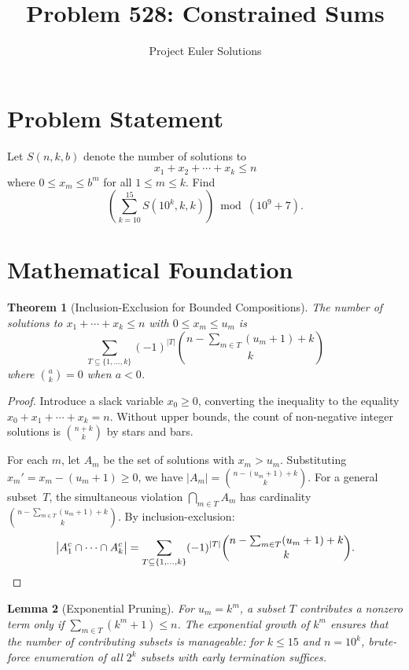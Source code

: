 \documentclass[11pt]{article}
\title{Problem 528: Constrained Sums}
\author{Project Euler Solutions}
\date{}
\newtheorem{theorem}{Theorem}
\newtheorem{lemma}[theorem]{Lemma}
\begin{document}
\maketitle

\section{Problem Statement}
Let $S(n,k,b)$ denote the number of solutions to
\[
x_1 + x_2 + \cdots + x_k \le n
\]
where $0 \le x_m \le b^m$ for all $1 \le m \le k$. Find
\[
\left(\sum_{k=10}^{15} S(10^k, k, k)\right) \bmod (10^9+7).
\]

\section{Mathematical Foundation}

\begin{theorem}[Inclusion-Exclusion for Bounded Compositions]
The number of solutions to $x_1 + \cdots + x_k \le n$ with $0 \le x_m \le u_m$ is
\[
\sum_{T \subseteq \{1,\ldots,k\}} (-1)^{|T|} \binom{n - \sum_{m \in T}(u_m+1) + k}{k}
\]
where $\binom{a}{k} = 0$ when $a < 0$.
\end{theorem}

\begin{proof}
Introduce a slack variable $x_0 \ge 0$, converting the inequality to the equality $x_0 + x_1 + \cdots + x_k = n$. Without upper bounds, the count of non-negative integer solutions is $\binom{n+k}{k}$ by stars and bars.

For each $m$, let $A_m$ be the set of solutions with $x_m > u_m$. Substituting $x_m' = x_m - (u_m+1) \ge 0$, we have $|A_m| = \binom{n-(u_m+1)+k}{k}$. For a general subset~$T$, the simultaneous violation $\bigcap_{m \in T} A_m$ has cardinality $\binom{n - \sum_{m \in T}(u_m+1)+k}{k}$. By inclusion-exclusion:
\[
\bigl|A_1^c \cap \cdots \cap A_k^c\bigr| = \sum_{T \subseteq \{1,\ldots,k\}} (-1)^{|T|}\binom{n - \sum_{m \in T}(u_m+1)+k}{k}. \qedhere
\]
\end{proof}

\begin{lemma}[Exponential Pruning]
For $u_m = k^m$, a subset $T$ contributes a nonzero term only if $\sum_{m \in T}(k^m+1) \le n$. The exponential growth of $k^m$ ensures that the number of contributing subsets is manageable: for $k \le 15$ and $n = 10^k$, brute-force enumeration of all $2^k$ subsets with early termination suffices.
\end{lemma}
\end{document}
